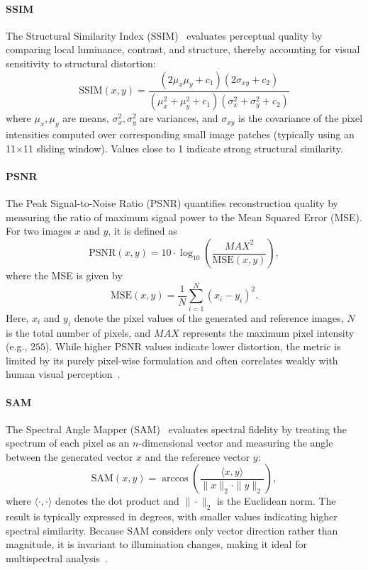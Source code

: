 \documentclass[remotesensing,article,submit,pdftex,moreauthors]{Definitions/mdpi}
\begin{document}
\paragraph{\textbf{SSIM}} The Structural Similarity Index (SSIM)~\cite{iqa_ssim} evaluates perceptual quality by comparing local luminance, contrast, and structure, thereby accounting for visual sensitivity to structural distortion:
\begin{equation}
\text{SSIM}(x,y) = \frac{(2\mu_x \mu_y + c_1)(2\sigma_{xy} + c_2)}{(\mu_x^2 + \mu_y^2 + c_1)(\sigma_x^2 + \sigma_y^2 + c_2)}
\end{equation}
where $\mu_x, \mu_y$ are means, $\sigma_x^2, \sigma_y^2$ are variances, and $\sigma_{xy}$ is the covariance of the pixel intensities computed over corresponding small image patches (typically using an 11$\times$11 sliding window). Values close to 1 indicate strong structural similarity.


\paragraph{\textbf{PSNR}} 
The Peak Signal-to-Noise Ratio (PSNR) quantifies reconstruction quality by measuring the ratio of maximum signal power to the Mean Squared Error (MSE). For two images $x$ and $y$, it is defined as
\begin{equation}
\text{PSNR}(x,y) = 10 \cdot \log_{10} \left( \frac{MAX^2}{\text{MSE}(x,y)} \right),
\end{equation}
where the MSE is given by
\begin{equation}
\text{MSE}(x,y) = \frac{1}{N} \sum_{i=1}^{N} (x_i - y_i)^2.
\end{equation}
Here, $x_i$ and $y_i$ denote the pixel values of the generated and reference images, $N$ is the total number of pixels, and $MAX$ represents the maximum pixel intensity (e.g., $255$). While higher PSNR values indicate lower distortion, the metric is limited by its purely pixel-wise formulation and often correlates weakly with human visual perception~\cite{DiffCR}.


\paragraph{\textbf{SAM}} 
The Spectral Angle Mapper (SAM)~\cite{iqa_sam} evaluates spectral fidelity by treating the spectrum of each pixel as an \(n\)-dimensional vector and measuring the angle between the generated vector $x$ and the reference vector $y$:
\begin{equation}
\text{SAM}(x,y) = \arccos \left( \frac{\langle x, y \rangle}{\|x\|_2 \cdot \|y\|_2} \right),
\end{equation}
where $\langle \cdot, \cdot \rangle$ denotes the dot product and $\|\cdot\|_2$ is the Euclidean norm. The result is typically expressed in degrees, with smaller values indicating higher spectral similarity. Because SAM considers only vector direction rather than magnitude, it is invariant to illumination changes, making it ideal for multispectral analysis~\cite{S2MS_GAN}.
\end{document}
